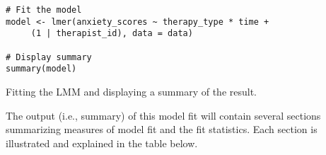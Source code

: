 \begin{tcolorbox}[every float=\centering, drop shadow,     title=R Code]
\begin{verbatim}
# Fit the model
model <- lmer(anxiety_scores ~ therapy_type * time + 
     (1 | therapist_id), data = data)

# Display summary
summary(model)    \end{verbatim}
\tcblower
\begin{codeblock}{Fitting the LMM and displaying a summary of the result.}\label{code:LMMfit}\end{codeblock}
\end{tcolorbox}
\clearpage

 The output (i.e., summary) of this model fit will contain several sections summarizing measures of model fit and the fit statistics. Each section is illustrated and explained in the table below.

